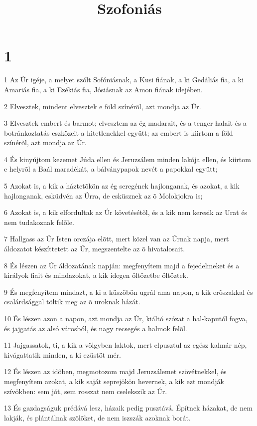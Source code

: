 

\title{Szofoniás}


\chapter{1}

\par 1 Az Úr igéje, a melyet szólt Sofóniásnak, a Kusi fiának, a ki Gedáliás fia, a ki Amariás fia, a ki Ezékiás fia, Jósiásnak az Amon fiának idejében.
\par 2 Elvesztek, mindent elvesztek e föld színérõl, azt mondja az Úr.
\par 3 Elvesztek embert és barmot; elvesztem az ég madarait, és a tenger halait és a botránkoztatás eszközeit a hitetlenekkel együtt; az embert is kiirtom a föld színérõl, azt mondja az Úr.
\par 4 És kinyújtom kezemet Júda ellen és Jeruzsálem minden lakója ellen, és kiirtom e helyrõl a Baál maradékát, a bálványpapok nevét a papokkal együtt;
\par 5 Azokat is, a kik a háztetõkön az ég seregének hajlonganak, és azokat, a kik hajlonganak, esküdvén az Úrra, de esküsznek az õ Molokjokra is;
\par 6 Azokat is, a kik elfordultak az Úr követésétõl, és a kik nem keresik az Urat és nem tudakoznak felõle.
\par 7 Hallgass az Úr Isten orczája elõtt, mert közel van az Úrnak napja, mert áldozatot készíttetett az Úr, megszentelte az õ hivatalosait.
\par 8 És lészen az Úr áldozatának napján: megfenyítem majd a fejedelmeket és a királyok fiait és mindazokat, a kik idegen öltözetbe öltöztek.
\par 9 És megfenyítem mindazt, a ki a küszöbön ugrál ama napon, a kik erõszakkal és csalárdsággal töltik meg az õ uroknak házát.
\par 10 És lészen azon a napon, azt mondja az Úr, kiáltó szózat a hal-kaputól fogva, és jajgatás az alsó városból, és nagy recsegés a halmok felõl.
\par 11 Jajgassatok, ti, a kik a völgyben laktok, mert elpusztul az egész kalmár nép, kivágattatik minden, a ki ezüstöt mér.
\par 12 És lészen az idõben, megmotozom majd Jeruzsálemet szövétnekkel, és megfenyítem azokat, a kik saját seprejökön hevernek, a kik ezt mondják szívökben: sem jót, sem rosszat nem cselekszik az Úr.
\par 13 És gazdagságuk prédává lesz, házaik pedig pusztává. Építnek házakat, de nem lakják, és plántálnak szõlõket, de nem iszszák azoknak borát.
